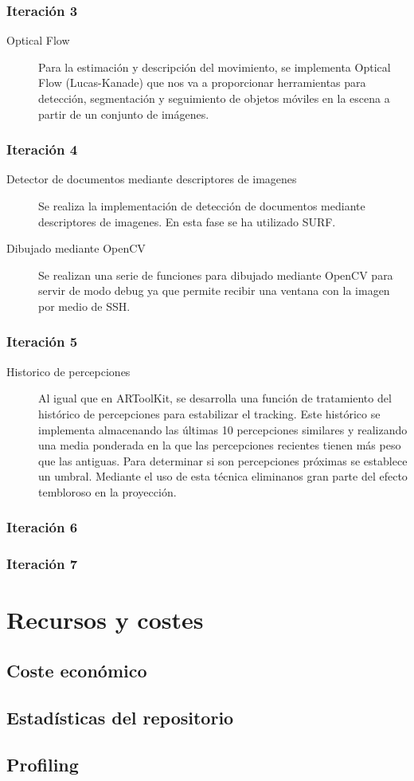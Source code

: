\subsubsection{Iteración 3}
\begin{description}
\item [Optical Flow] Para la estimación y descripción del movimiento, se implementa Optical Flow  (Lucas-Kanade) que nos va a proporcionar herramientas para detección, segmentación y seguimiento de  objetos móviles en la escena a partir de un conjunto de imágenes. 

\end{description}
\subsubsection{Iteración 4}
\begin{description}
\item [Detector de documentos mediante descriptores de imagenes] Se realiza la implementación de detección de documentos mediante descriptores de imagenes. En esta fase se ha utilizado SURF.
\item [Dibujado mediante OpenCV] Se realizan una serie de funciones para dibujado mediante OpenCV para servir de modo debug ya que permite recibir una ventana con la imagen por medio de SSH.
\end{description}

\subsubsection{Iteración 5}
\begin{description}
\item [Historico de percepciones] Al igual que en ARToolKit, se desarrolla una función de tratamiento del histórico de percepciones para estabilizar el tracking. Este histórico se implementa  almacenando las últimas 10 percepciones similares y realizando una media ponderada en la que las percepciones recientes tienen más peso que las antiguas. Para determinar si son percepciones próximas se establece un umbral. Mediante el uso de esta técnica eliminanos gran parte del efecto tembloroso en la proyección.
\end{description}

\subsubsection{Iteración 6}
\subsubsection{Iteración 7}


\section{Recursos y costes}
\subsection{Coste económico}
\subsection{Estadísticas del repositorio}
\subsection{Profiling}